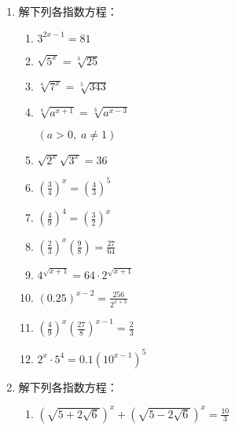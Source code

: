 \begin{enumerate}
  \item 解下列各指数方程：
\begin{multicols}{2}
\begin{enumerate}
\item $3^{2 x-1}=81$
\item $\sqrt{5^{x}}=\sqrt[3]{25}$
\item  $\sqrt[4]{7^{x}}=\sqrt[5]{343}$
\item $\sqrt[4]{a^{x+1}}=\sqrt[3]{a^{x-3}}$

$(a>0,\;  a \neq 1)$
\item  $\sqrt{2^{x}} \sqrt{3^{x}}=36$
\item $\left(\frac{3}{4}\right)^x=\left(\frac{4}{3}\right)^5$
  \item $\left(\frac{4}{9}\right)^{4}=\left(\frac{3}{2}\right)^{x}$
  \item $\left(\frac{2}{3}\right)^{x}\left(\frac{9}{8}\right)=\frac{27}{64}$
  \item $ 4^{\sqrt{x+1}}=64 \cdot 2^{\sqrt{x+1}} $
  \item $(0.25)^{x-2}=\frac{256}{2^{x+3}}$
  \item  $\left(\frac{4}{9}\right)^{x}\left(\frac{27}{8}\right)^{x-1}=\frac{2}{3}$
  \item  $2^{x} \cdot 5^{4}=0.1\left(10^{x-1}\right)^{5}$
\end{enumerate}
\end{multicols}


\item  解下列各指数方程：
\begin{enumerate}
\item   $\left(\sqrt{5+2 \sqrt{6}}\right)^{x}+\left(\sqrt{5-2 \sqrt{6}}\right)^{x}=\frac{10}{3}$
\end{enumerate}



\end{enumerate}
